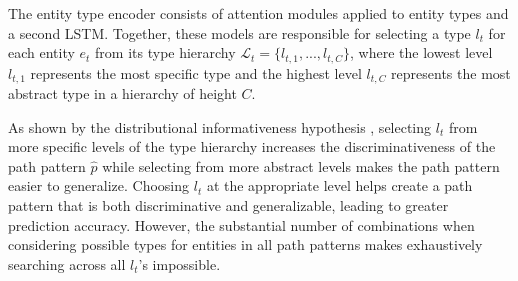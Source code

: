 \documentclass[letterpaper]{article} %
\begin{document}
The entity type encoder consists of attention modules applied to entity types and a second LSTM. 
Together, these models are responsible for selecting a type $l_t$ for each entity $e_t$ from its type hierarchy $\mathcal{L}_t = \{ l_{t,1},...,l_{t,C}\}$, where the lowest level $l_{t,1}$ represents the most specific type and the highest level $l_{t,C}$ represents the most abstract type in a hierarchy of height $C$.

As shown by the distributional informativeness hypothesis \cite{santus2014hypernym}, selecting $l_t$ from more specific levels of the type hierarchy increases the discriminativeness of the path pattern $\hat{p}$ while selecting from more abstract levels makes the path pattern easier to generalize. Choosing $l_t$ at the appropriate level helps create a path pattern that is both discriminative and generalizable, leading to greater prediction accuracy. However, the substantial number of combinations when considering possible types for entities in all path patterns makes exhaustively searching across all $l_t$'s impossible.


\end{document}
